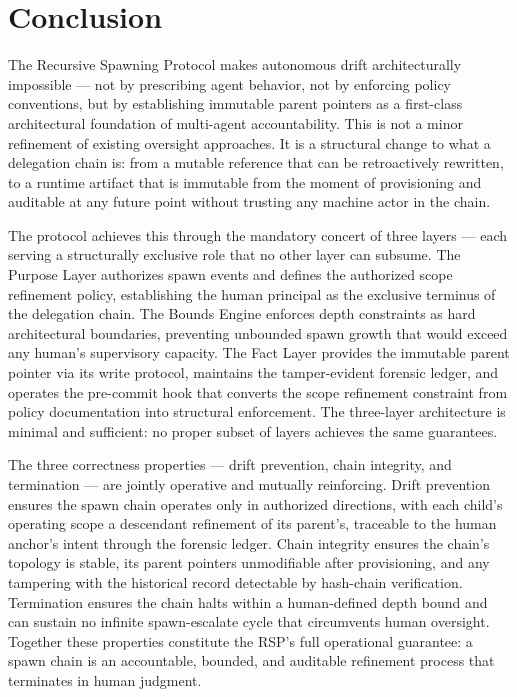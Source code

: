 \section{Conclusion}
\label{sec:rs-conclusion}

The Recursive Spawning Protocol makes autonomous drift architecturally impossible — not by prescribing agent behavior, not by enforcing policy conventions, but by establishing immutable parent pointers as a first-class architectural foundation of multi-agent accountability. This is not a minor refinement of existing oversight approaches. It is a structural change to what a delegation chain is: from a mutable reference that can be retroactively rewritten, to a runtime artifact that is immutable from the moment of provisioning and auditable at any future point without trusting any machine actor in the chain.

The protocol achieves this through the mandatory concert of three \bxthree layers — each serving a structurally exclusive role that no other layer can subsume. The Purpose Layer authorizes spawn events and defines the authorized scope refinement policy, establishing the human principal as the exclusive terminus of the delegation chain. The Bounds Engine enforces depth constraints as hard architectural boundaries, preventing unbounded spawn growth that would exceed any human's supervisory capacity. The Fact Layer provides the immutable parent pointer via its write protocol, maintains the tamper-evident forensic ledger, and operates the pre-commit hook that converts the scope refinement constraint from policy documentation into structural enforcement. The three-layer architecture is minimal and sufficient: no proper subset of layers achieves the same guarantees.

The three correctness properties — drift prevention, chain integrity, and termination — are jointly operative and mutually reinforcing. Drift prevention ensures the spawn chain operates only in authorized directions, with each child's operating scope a descendant refinement of its parent's, traceable to the human anchor's intent through the forensic ledger. Chain integrity ensures the chain's topology is stable, its parent pointers unmodifiable after provisioning, and any tampering with the historical record detectable by hash-chain verification. Termination ensures the chain halts within a human-defined depth bound and can sustain no infinite spawn-escalate cycle that circumvents human oversight. Together these properties constitute the RSP's full operational guarantee: a spawn chain is an accountable, bounded, and auditable refinement process that terminates in human judgment.

